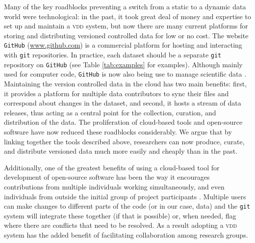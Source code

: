 \documentclass[a4paper,11pt]{article}
\newcommand{\smurl}[1]{{\footnotesize\url{#1}}}
\begin{document}
Many of the key roadblocks preventing a switch from a static to a dynamic data world were technological: in the past, it took great deal of money and expertise to set up and maintain a \textsc{vdd} system, but now there are many current platforms for storing and distributing versioned controlled data for low or no cost.  The website \texttt{GitHub} (\smurl{www.github.com}) is a commercial platform for hosting and interacting with \texttt{git} repositories. In practice, each dataset should be a separate \texttt{git} repository on \texttt{GitHub} (see Table \ref{tab:examples} for examples). Although mainly used for computer code, \texttt{GitHub} is now also being use to manage scientific data \citep{Perkel-2016}. Maintaining the version controlled data in the cloud has two main benefits: first, it provides a platform for multiple data contributors to sync their files and correspond about changes in the dataset, and second, it hosts a stream of data releases, thus acting as a central point for  the collection, curation, and distribution of the data.  The proliferation of cloud-based tools and open-source software have now reduced these roadblocks considerably.  We argue that by linking together the tools described above, researchers can now produce, curate, and distribute versioned data much more easily and cheaply than in the past.


Additionally, one of the greatest benefits of using a cloud-based tool for development of open-source software has been the way it encourages contributions from multiple individuals working simultaneously, and even individuals from outside the initial group of project participants \citep{Rogers-2013}. Multiple users can make changes to different parts of the code (or in our case, data) and the \texttt{git} system will integrate these together (if that is possible) or, when needed, flag where there are conflicts that need to be resolved. As a result adopting a \textsc{vdd} system has the added benefit of facilitating collaboration among research groups.
\end{document}
